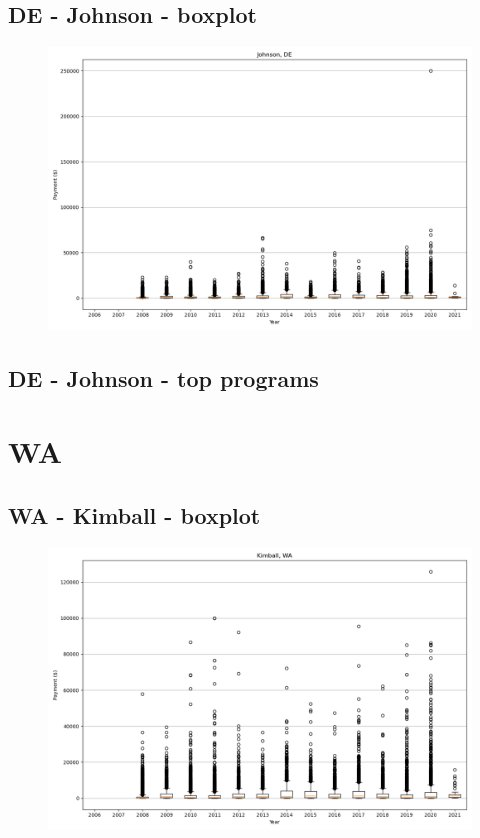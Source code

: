 \subsection*{DE - Johnson - boxplot}
\begin{figure}[h]
\centering
\includegraphics[width=7in]{../output/boxplots/counties/Johnson-DE_boxplot.png}
\end{figure}


\subsection*{DE - Johnson - top programs}

\newpage
\section*{WA}
\subsection*{WA - Kimball - boxplot}
\begin{figure}[h]
\centering
\includegraphics[width=7in]{../output/boxplots/counties/Kimball-WA_boxplot.png}
\end{figure}


